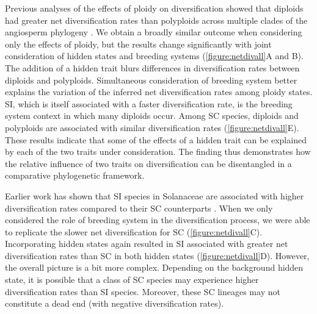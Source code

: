 Previous analyses of the effects of ploidy on diversification showed that diploids had greater net diversification rates than polyploids across multiple clades of the angiosperm phylogeny \citep{mayrose_2011, mayrose_2015}. 
We obtain a broadly similar outcome when considering only the effects of ploidy, but the results change significantly with joint consideration of hidden states and breeding systems (\cref{figure:netdivall}A and B). 
The addition of a hidden trait blurs differences in diversification rates between diploids and polyploids.
Simultaneous consideration of breeding system better explains the variation of the inferred net diversification rates among ploidy states. 
SI, which is itself associated with a faster diversification rate, is the breeding system context in which many diploids occur.
Among SC species, diploids and polyploids are associated with similar diversification rates (\cref{figure:netdivall}E).
These results indicate that some of the effects of a hidden trait can be explained by each of the two traits under consideration. 
The finding thus demonstrates how the relative influence of two traits on diversification can be disentangled in a comparative phylogenetic framework.

Earlier work has shown that SI species in Solanaceae are associated with higher diversification rates compared to their SC counterparts \citep{goldberg_2010}. 
When we only considered the role of breeding system in the diversification process, we were able to replicate the slower net diversification for SC  (\cref{figure:netdivall}C).  %
Incorporating hidden states again resulted in SI associated with greater net diversification rates than SC in both hidden states  (\cref{figure:netdivall}D). 
However, the overall picture is a bit more complex.
Depending on the background hidden state, it is possible that a class of SC species may experience higher diversification rates than SI species.
Moreover, these SC lineages may not constitute a dead end (with negative diversification rates).




